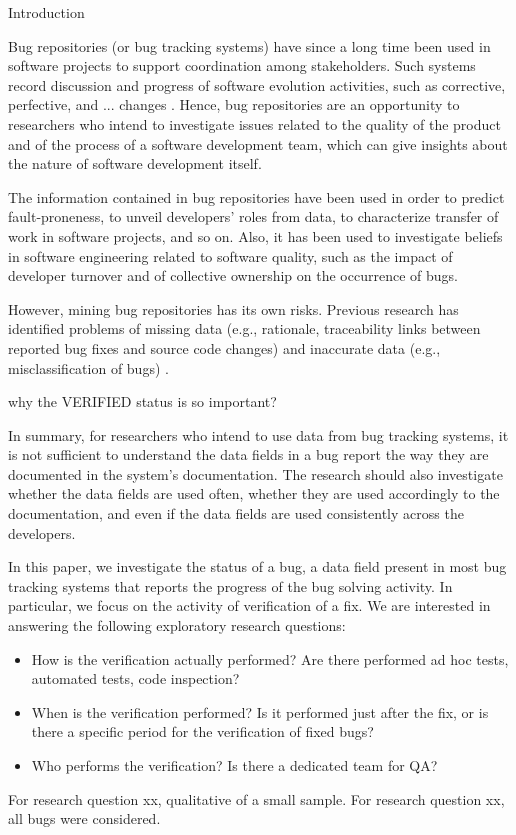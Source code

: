 \begin{section}{Introduction}

Bug repositories (or bug tracking systems) have since a long time been used in software projects to support coordination among stakeholders. Such systems record discussion and progress of software evolution activities, such as corrective, perfective, and ... changes \cite{Antoniol2008}. Hence, bug repositories are an opportunity to researchers who intend to investigate issues related to the quality of the product and of the process of a software development team, which can give insights about the nature of software development itself.

The information contained in bug repositories have been used in order to predict fault-proneness, to unveil developers' roles from data, to characterize transfer of work in software projects, and so on. Also, it has been used to investigate beliefs in software engineering related to software quality, such as the impact of developer turnover and of collective ownership on the occurrence of bugs.

However, mining bug repositories has its own risks. Previous research has identified problems of missing data (e.g., rationale, traceability links between reported bug fixes and source code changes) and inaccurate data (e.g., misclassification of bugs) \cite{Aranda2009,Bird2009,Nguyen2010,Ayari2007}.

\TODO why the VERIFIED status is so important?

In summary, for researchers who intend to use data from bug tracking systems, it is not sufficient to understand the data fields in a bug report the way they are documented in the system's documentation. The research should also investigate whether the data fields are used often, whether they are used accordingly to the documentation, and even if the data fields are used consistently across the developers.

In this paper, we investigate the status of a bug, a data field present in most bug tracking systems that reports the progress of the bug solving activity. In particular, we focus on the activity of verification of a fix. We are interested in answering the following exploratory research questions:

\begin{itemize}
	\item How is the verification actually performed? Are there performed ad hoc tests, automated tests, code inspection?
	\item When is the verification performed? Is it performed just after the fix, or is there a specific period for the verification of fixed bugs?
	\item Who performs the verification? Is there a dedicated team for QA? 
\end{itemize}

For research question xx, qualitative of a small sample. 
For research question xx, all bugs were considered.

\end{section}

